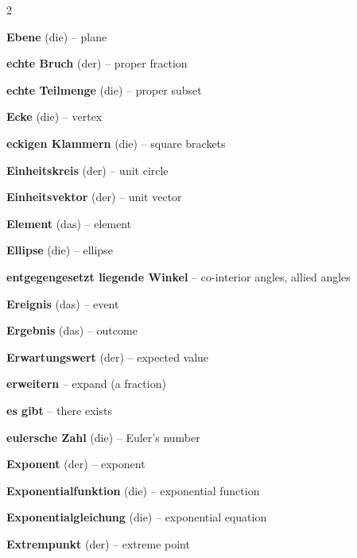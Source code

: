 \begin{multicols}{2}
\par\nopagebreak
\textbf{Ebene} (die) -- plane\dotfill\hyperref[e:308]{\pageref*{e:308}}\par
\textbf{echte Bruch} (der) -- proper fraction\dotfill\hyperref[e:31]{\pageref*{e:31}}\par
\textbf{echte Teilmenge} (die) -- proper subset\dotfill\hyperref[e:99]{\pageref*{e:99}}\par
\textbf{Ecke} (die) -- vertex\dotfill\hyperref[e:245]{\pageref*{e:245}}\par
\textbf{eckigen Klammern} (die) -- square brackets\dotfill\hyperref[e:89]{\pageref*{e:89}}\par
\textbf{Einheitskreis} (der) -- unit circle\dotfill\hyperref[e:137]{\pageref*{e:137}}\par
\textbf{Einheitsvektor} (der) -- unit vector\dotfill\hyperref[e:303]{\pageref*{e:303}}\par
\textbf{Element} (das) -- element\dotfill\hyperref[e:97]{\pageref*{e:97}}\par
\textbf{Ellipse} (die) -- ellipse\dotfill\hyperref[e:314]{\pageref*{e:314}}\par
\textbf{entgegengesetzt liegende Winkel} -- co-interior angles, allied angles\dotfill\hyperref[e:169]{\pageref*{e:169}}\par
\textbf{Ereignis} (das) -- event\dotfill\hyperref[e:328]{\pageref*{e:328}}\par
\textbf{Ergebnis} (das) -- outcome\dotfill\hyperref[e:327]{\pageref*{e:327}}\par
\textbf{Erwartungswert} (der) -- expected value\dotfill\hyperref[e:335]{\pageref*{e:335}}\par
\textbf{erweitern} -- expand (a fraction)\dotfill\hyperref[e:38]{\pageref*{e:38}}\par
\textbf{es gibt} -- there exists\dotfill\hyperref[e:353]{\pageref*{e:353}}\par
\textbf{eulersche Zahl} (die) -- Euler's number\dotfill\hyperref[e:298]{\pageref*{e:298}}\par
\textbf{Exponent} (der) -- exponent\dotfill\hyperref[e:44]{\pageref*{e:44}}\par
\textbf{Exponentialfunktion} (die) -- exponential function\dotfill\hyperref[e:130]{\pageref*{e:130}}\par
\textbf{Exponentialgleichung} (die) -- exponential equation\dotfill\hyperref[e:84]{\pageref*{e:84}}\par
\textbf{Extrempunkt} (der) -- extreme point\dotfill\hyperref[e:281]{\pageref*{e:281}}\par


\end{multicols}
